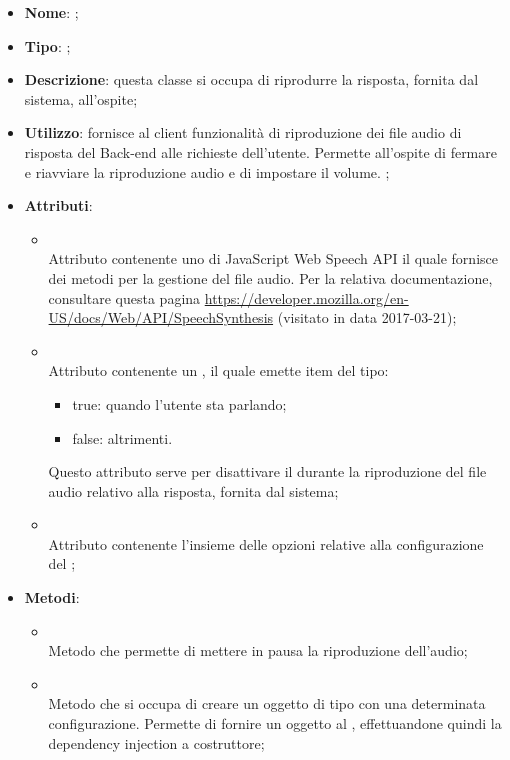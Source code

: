 \begin{itemize}
	\item \textbf{Nome}: ;
	\item \textbf{Tipo}: ;
	\item \textbf{Descrizione}: questa classe si occupa di riprodurre la risposta, fornita dal sistema, all'ospite;
	\item \textbf{Utilizzo}: fornisce al client funzionalità di riproduzione dei file audio di risposta del Back-end alle richieste dell'utente.
Permette all'ospite di fermare e riavviare la riproduzione audio e di impostare il volume.
;
	\item \textbf{Attributi}:
	\begin{itemize}
		\item[]  \\
		Attributo contenente uno  di JavaScript Web Speech API il quale fornisce dei metodi per la gestione del file audio.
Per la relativa documentazione, consultare questa pagina \url{https://developer.mozilla.org/en-US/docs/Web/API/SpeechSynthesis} (visitato in data 2017-03-21);
		\item[]  \\
		Attributo contenente un , il quale emette item del tipo:
\begin{itemize}
\item true: quando l'utente sta parlando;
\item false: altrimenti.
\end{itemize}
Questo attributo serve per disattivare il  durante la riproduzione del file audio relativo alla risposta, fornita dal sistema;
		\item[]  \\
		Attributo contenente l'insieme delle opzioni relative alla configurazione del ;
	\end{itemize}
	\item \textbf{Metodi}:
	\begin{itemize}
		\item[]  \\		Metodo che permette di mettere in pausa la riproduzione dell'audio;\\
		\item[]  \\		Metodo che si occupa di creare un oggetto di tipo  con una determinata configurazione. Permette di fornire un oggetto  al , effettuandone quindi la dependency injection a costruttore;\\

\end{itemize}
\end{itemize}
